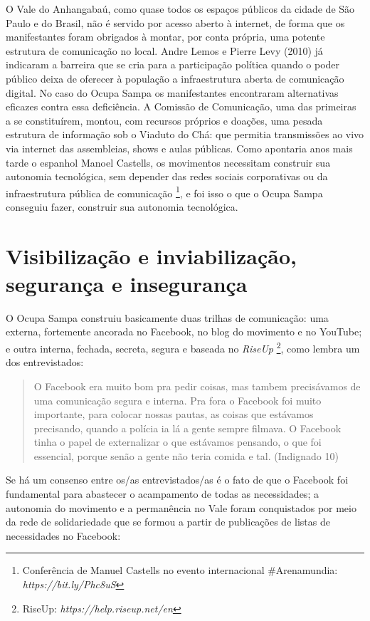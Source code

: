 O Vale do Anhangabaú, como quase todos os espaços públicos da cidade de
São Paulo e do Brasil, não é servido por acesso aberto à internet, de
forma que os manifestantes foram obrigados à montar, por conta própria,
uma potente estrutura de comunicação no local. Andre Lemos e Pierre Levy
(2010) já indicaram a barreira que se cria para a participação política
quando o poder público deixa de oferecer à população a infraestrutura
aberta de comunicação digital. No caso do Ocupa Sampa os manifestantes
encontraram alternativas eficazes contra essa deficiência. A Comissão de
Comunicação, uma das primeiras a se constituírem, montou, com recursos
próprios e doações, uma pesada estrutura de informação sob o Viaduto do
Chá: que permitia transmissões ao vivo via internet das assembleias,
shows e aulas públicas. Como apontaria anos mais tarde o espanhol Manoel
Castells, os movimentos necessitam construir sua autonomia tecnológica,
sem depender das redes sociais corporativas ou da infraestrutura pública
de comunicação \footnote{Conferência de Manuel Castells no evento
  internacional \#Arenamundia:
  \emph{https://bit.ly/Phc8uS}},
e foi isso o que o Ocupa Sampa conseguiu fazer, construir sua autonomia
tecnológica.

\section{Visibilização e inviabilização, segurança e insegurança}

O Ocupa Sampa construiu basicamente duas trilhas de comunicação: uma
externa, fortemente ancorada no Facebook, no blog do movimento e no
YouTube; e outra interna, fechada, secreta, segura e baseada no
\emph{RiseUp} \footnote{RiseUp: \emph{https://help.riseup.net/en}}, como
lembra um dos entrevistados:

\begin{quote}
O Facebook era muito bom pra pedir coisas, mas tambem precisávamos de
uma comunicação segura e interna. Pra fora o Facebook foi muito
importante, para colocar nossas pautas, as coisas que estávamos
precisando, quando a polícia ia lá a gente sempre filmava. O Facebook
tinha o papel de externalizar o que estávamos pensando, o que foi
essencial, porque senão a gente não teria comida e tal. (Indignado 10)
\end{quote}

Se há um consenso entre os/as entrevistados/as é o fato de que o
Facebook foi fundamental para abastecer o acampamento de todas as
necessidades; a autonomia do movimento e a permanência no Vale foram
conquistados por meio da rede de solidariedade que se formou a partir de
publicações de listas de necessidades no Facebook:

